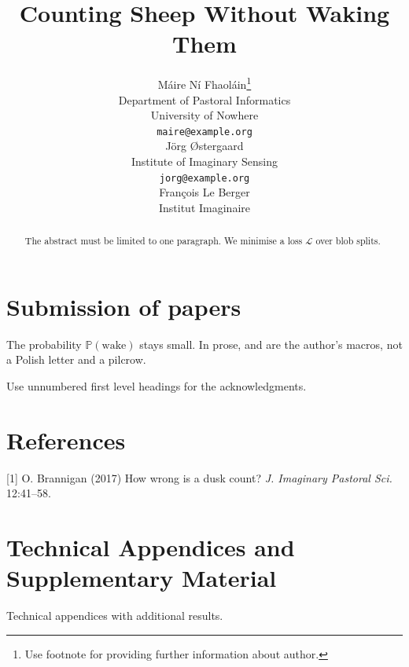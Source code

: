 \documentclass{article}
\title{Counting Sheep Without Waking Them}
\author{%
  M\'aire N\'i Fhaol\'ain\thanks{Use footnote for providing further information about author.} \\
  Department of Pastoral Informatics\\
  University of Nowhere\\
  \texttt{maire@example.org} \\
  \And
  J\"org \O{}stergaard \\
  Institute of Imaginary Sensing \\
  \texttt{jorg@example.org} \\
  \AND
  Fran\c{c}ois Le Berger \\
  Institut Imaginaire \\
}
\newcommand{\P}{\mathbb{P}}
\newcommand{\L}{\mathcal{L}}
\begin{document}
\maketitle

\begin{abstract}
  The abstract must be limited to one paragraph. We minimise a loss $\L$ over blob splits.
\end{abstract}

\section{Submission of papers}
The probability $\P(\text{wake})$ stays small. In prose, \L{} and \P{} are the author's macros, not a Polish letter and a pilcrow.

\begin{ack}
Use unnumbered first level headings for the acknowledgments.
\end{ack}

\section*{References}
{\small
[1] O. Brannigan (2017) How wrong is a dusk count? {\it J. Imaginary Pastoral Sci.} 12:41--58.
}

\appendix
\section{Technical Appendices and Supplementary Material}
Technical appendices with additional results.
\end{document}
